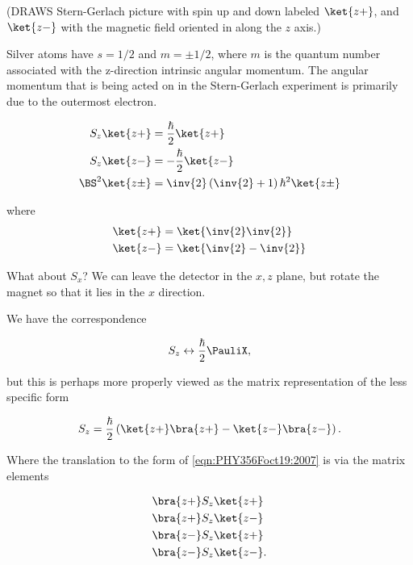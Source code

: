 (DRAWS Stern-Gerlach picture with spin up and down labeled $\ket{z+}$, and $\ket{z-}$ with the magnetic field oriented in along the $z$ axis.)

Silver atoms have $s = 1/2$ and $m= \pm 1/2$, where $m$ is the quantum number associated with the z-direction intrinsic angular momentum.  The angular momentum that is being acted on in the Stern-Gerlach experiment is primarily due to the outermost electron.

\begin{align}\label{eqn:PHY356Foct19:2005}
S_z \ket{z+} &= \frac{\hbar}{2} \ket{z+} \\
S_z \ket{z-} &= -\frac{\hbar}{2} \ket{z-} \\
\BS^2 \ket{z\pm} &= \inv{2} \left( \inv{2} + 1 \right) \hbar^2 \ket{z\pm}
\end{align}

where
\begin{align}\label{eqn:PHY356Foct19:2006}
\ket{z+} &= \ket{ \inv{2} \inv{2} } \\
\ket{z-} &= \ket{ \inv{2} -\inv{2} }
\end{align}


What about $S_x$?  We can leave the detector in the $x,z$ plane, but rotate the magnet so that it lies in the $x$ direction.  

We have the correspondence

\begin{align}\label{eqn:PHY356Foct19:2007}
S_z \leftrightarrow \frac{\hbar}{2} \PauliX,
\end{align}

but this is perhaps more properly viewed as the matrix representation of the less specific form

\begin{align}\label{eqn:PHY356Foct19:2008}
S_z = \frac{\hbar}{2} \left(
\ket{z+} \bra{z+}
-\ket{z-} \bra{z-}
\right).
\end{align}

Where the translation to the form of \ref{eqn:PHY356Foct19:2007} is via the matrix elements

\begin{align}\label{eqn:PHY356Foct19:2008a}
&\bra{z+} S_z \ket{z+} \\
&\bra{z+} S_z \ket{z-} \\
&\bra{z-} S_z \ket{z+} \\
&\bra{z-} S_z \ket{z-}.
\end{align}

